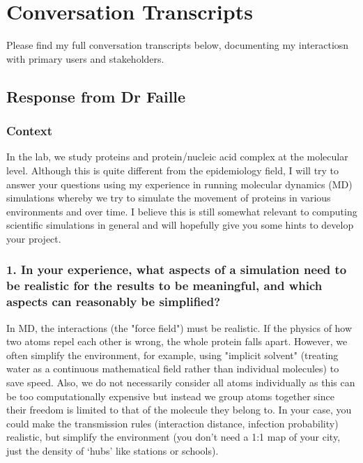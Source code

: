 \chapter{Conversation Transcripts}
Please find my full conversation transcripts below, documenting my interactiosn with primary users and stakeholders.

\section{Response from Dr Faille}
\label{sec:responseDrFaille}
\subsection*{Context}
In the lab, we study proteins and protein/nucleic acid complex at the molecular level. Although this is quite different from the epidemiology field, I will try to answer your questions using my experience in running molecular dynamics (MD) simulations whereby we try to simulate the movement of proteins in various environments and over time. I believe this is still somewhat relevant to computing scientific simulations in general and will hopefully give you some hints to develop your project.

\subsection*{1. In your experience, what aspects of a simulation need to be realistic for the results to be meaningful, and which aspects can reasonably be simplified?}
In MD, the interactions (the "force field") must be realistic. If the physics of how two atoms repel each other is wrong, the whole protein falls apart. However, we often simplify the environment, for example, using "implicit solvent" (treating water as a continuous mathematical field rather than individual molecules) to save speed. Also, we do not necessarily consider all atoms individually as this can be too computationally expensive but instead we group atoms together since their freedom is limited to that of the molecule they belong to. In your case, you could make the transmission rules (interaction distance, infection probability) realistic, but simplify the environment (you don't need a 1:1 map of your city, just the density of ‘hubs’ like stations or schools).

